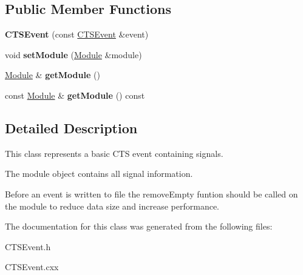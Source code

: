 \subsection*{Public Member Functions}
\begin{DoxyCompactItemize}
\item 
\mbox{\label{classCTSEvent_a9635121dd317e3a1f2c9dce8e8a62970}} 
{\bfseries C\+T\+S\+Event} (const \hyperlink{classCTSEvent}{C\+T\+S\+Event} \&event)
\item 
\mbox{\label{classCTSEvent_a681a21060ad13d5843509989be2c345d}} 
void {\bfseries set\+Module} (\hyperlink{classModule}{Module} \&module)
\item 
\mbox{\label{classCTSEvent_a19b2ee23f6334def487ba09fc50af858}} 
\hyperlink{classModule}{Module} \& {\bfseries get\+Module} ()
\item 
\mbox{\label{classCTSEvent_a0f2195c2a65119e85b4cfc3a1bf72c0f}} 
const \hyperlink{classModule}{Module} \& {\bfseries get\+Module} () const
\end{DoxyCompactItemize}


\subsection{Detailed Description}
This class represents a basic C\+TS event containing signals.

The module object contains all signal information.

Before an event is written to file the remove\+Empty funtion should be called on the module to reduce data size and increase performance. 

The documentation for this class was generated from the following files\+:\begin{DoxyCompactItemize}
\item 
C\+T\+S\+Event.\+h\item 
C\+T\+S\+Event.\+cxx\end{DoxyCompactItemize}
